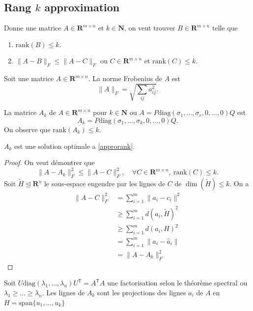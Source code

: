 \subsection{Rang \texorpdfstring{$k$}{k} approximation}
\begin{problem}\label{approrank}
Donne une matrice $A\in \mathbf{R}^{m\times n}$ et $k\in \mathbf{N}$, on veut trouver $B\in \mathbf{R}^{m\times n}$ telle que
\begin{enumerate}
\item $\mathrm{rank}(B)\le k$.
\item $\lVert A-B \rVert_{F}\le\lVert A-C \rVert_{F}$ ou $C\in \mathbf{R}^{m\times n}$ et $\mathrm{rank}(C)\le k$.
\end{enumerate}
\end{problem}
\begin{definition}
Soit une matrice $A\in \mathbf{R}^{m\times n}$. La norme Frobenius de $A$ est 
$$
\lVert A \rVert _{F}=\sqrt{ \sum _{ij}a_{ij}^{2} }.
$$
\end{definition}
\begin{definition}
La matrice $A_{k}$ de $A\in \mathbf{R}^{m\times n}$ pour $k\in \mathbf{N}$ ou $A=P\mathrm{diag}(\sigma_{1},\dots,\sigma_{r},0,\dots,0)Q$ est
$$
A_{k}=P\mathrm{diag}(\sigma_{1},\dots,\sigma _{k},0,\dots,0)Q.
$$
On observe que $\mathrm{rank}(A_{k})\le k$.
\end{definition}
\begin{theorem}
$A_{k}$ est une solution optimale a \ref{approrank}.
\end{theorem}
\begin{proof}
On veut démontrer que 
$$
\lVert A-A_{k} \rVert _{F}^{2}\le \lVert A-C \rVert _{F}^{2} ,\quad \forall C\in \mathbf{R}^{m\times n}, ~\mathrm{rank}(C)\le k.
$$
Soit $\tilde{H}\unlhd\mathbf{R}^{n}$ le sous-espace engendre par les lignes de $C$ de $\dim(\tilde{H})\le k$. On a
\begin{align*}
\lVert A-C \rVert ^{2}_{F} & =\sum_{i=1}^{m} \lVert a_{i}-c_{i} \rVert ^{2} \\
 & \ge \sum_{i=1}^{m} d(a_{i},\tilde{H})^{2} \\
 & \ge \sum_{i=1}^{m} d(a_{i},H)^{2}  \\
 & =\sum_{i=1}^{m} \lVert a_{i}-\hat{a}_{i} \rVert \\
 & =\lVert A-A_{k} \rVert _{F}^{2} 
\end{align*}
\end{proof}
\begin{lemma}
Soit $U\mathrm{diag}(\lambda_{1},\dots,\lambda _{n})U^{\mathsf{T}}=A^{\mathsf{T}}A$ une factorisation selon le théorème spectral ou $\lambda_{1}\ge \dots\ge \lambda _{n}$. Les lignes de $A_{k}$ sont les projections des lignes $a_{i}$ de $A$ en $H=\mathrm{span}\{ u_{1},\dots,u_{k} \}$
\end{lemma}
